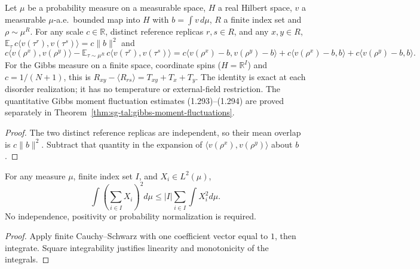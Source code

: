 \begin{lemma}
\label{lem:sg-tal:gibbs-centered-overlap}
\leanok
{}
Let $\mu$ be a probability measure on a measurable space, $H$ a real Hilbert space, $v$ a measurable $\mu$-a.e.\
bounded map into $H$ with $b=\int v\,d\mu$, $R$ a finite index set and $\rho\sim\mu^R$.
For any scale $c\in\mathbb R$, distinct reference replicas $r,s\in R$, and any $x,y\in R$,
$\mathbb E_{\tau}\,c\langle v(\tau^r),v(\tau^s)\rangle=c\|b\|^2$ and
\[
 c\langle v(\rho^x),v(\rho^y)\rangle
 -\mathbb E_{\tau\sim\mu^R}\,c\langle v(\tau^r),v(\tau^s)\rangle
 =c\langle v(\rho^x)-b,v(\rho^y)-b\rangle
  +c\langle v(\rho^x)-b,b\rangle+c\langle v(\rho^y)-b,b\rangle.
\]
For the Gibbs measure on a finite space, coordinate spins ($H=\mathbb R^I$) and $c=1/(N+1)$, this is
$R_{xy}-\langle R_{rs}\rangle=T_{xy}+T_x+T_y$.
The identity is exact at each disorder realization; it has no temperature or
external-field restriction. The quantitative Gibbs moment fluctuation estimates (1.293)--(1.294) are proved
separately in Theorem~\ref{thm:sg-tal:gibbs-moment-fluctuations}.
\end{lemma}
\begin{proof}
\leanok
The two distinct reference replicas are independent, so their mean overlap is
$c\|b\|^2$. Subtract that quantity in the expansion of
$\langle v(\rho^x),v(\rho^y)\rangle$ about $b$.
\end{proof}

\begin{lemma}
\label{lem:sg-tal:finite-sum-square}
\leanok
{}
For any measure $\mu$, finite index set $I$, and $X_i\in L^2(\mu)$,
\[
 \int\left(\sum_{i\in I}X_i\right)^2d\mu
 \le |I|\sum_{i\in I}\int X_i^2d\mu.
\]
No independence, positivity or probability normalization is required.
\end{lemma}
\begin{proof}
\leanok
Apply finite Cauchy--Schwarz with one coefficient vector equal to $1$, then integrate.
Square integrability justifies linearity and monotonicity of the integrals.
\end{proof}

